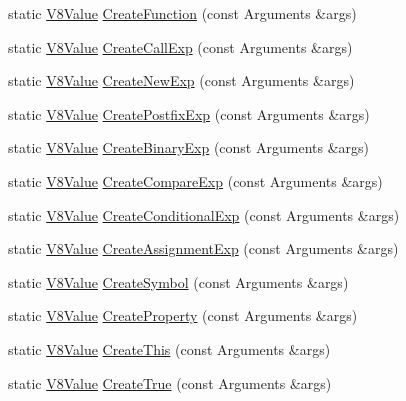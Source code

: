 \begin{DoxyCompactItemize}
static \hyperlink{namespacemocha_a22eca0d76f439fca2a26cae77eb6ade4}{V8Value} \hyperlink{classmocha_1_1_j_s_ast_ae958cde7c31cc2635b2a36ffdc0e3613}{CreateFunction} (const Arguments \&args)
\item 
static \hyperlink{namespacemocha_a22eca0d76f439fca2a26cae77eb6ade4}{V8Value} \hyperlink{classmocha_1_1_j_s_ast_a3b23f21605fc3f8766ad3ddf10e4b7e7}{CreateCallExp} (const Arguments \&args)
\item 
static \hyperlink{namespacemocha_a22eca0d76f439fca2a26cae77eb6ade4}{V8Value} \hyperlink{classmocha_1_1_j_s_ast_a263c0b57b8fe8d86b491c0f6ce002368}{CreateNewExp} (const Arguments \&args)
\item 
static \hyperlink{namespacemocha_a22eca0d76f439fca2a26cae77eb6ade4}{V8Value} \hyperlink{classmocha_1_1_j_s_ast_a7beae8b385014dbff724e289243e6cb7}{CreatePostfixExp} (const Arguments \&args)
\item 
static \hyperlink{namespacemocha_a22eca0d76f439fca2a26cae77eb6ade4}{V8Value} \hyperlink{classmocha_1_1_j_s_ast_a93636eb304578e4fb27a82627a02292b}{CreateBinaryExp} (const Arguments \&args)
\item 
static \hyperlink{namespacemocha_a22eca0d76f439fca2a26cae77eb6ade4}{V8Value} \hyperlink{classmocha_1_1_j_s_ast_a44502b59665456b9459fa45c85f79029}{CreateCompareExp} (const Arguments \&args)
\item 
static \hyperlink{namespacemocha_a22eca0d76f439fca2a26cae77eb6ade4}{V8Value} \hyperlink{classmocha_1_1_j_s_ast_a62a38a16e7be29850b729e73f024eea2}{CreateConditionalExp} (const Arguments \&args)
\item 
static \hyperlink{namespacemocha_a22eca0d76f439fca2a26cae77eb6ade4}{V8Value} \hyperlink{classmocha_1_1_j_s_ast_a0eb393ab91a1c9299243fd5c6b53c3c6}{CreateAssignmentExp} (const Arguments \&args)
\item 
static \hyperlink{namespacemocha_a22eca0d76f439fca2a26cae77eb6ade4}{V8Value} \hyperlink{classmocha_1_1_j_s_ast_a05f91fb94562e344f28eecae65d88d80}{CreateSymbol} (const Arguments \&args)
\item 
static \hyperlink{namespacemocha_a22eca0d76f439fca2a26cae77eb6ade4}{V8Value} \hyperlink{classmocha_1_1_j_s_ast_aa2eae030ff22ae6968d483e46e003860}{CreateProperty} (const Arguments \&args)
\item 
static \hyperlink{namespacemocha_a22eca0d76f439fca2a26cae77eb6ade4}{V8Value} \hyperlink{classmocha_1_1_j_s_ast_ae5138214790e162c52447a2f6bcc75fa}{CreateThis} (const Arguments \&args)
\item 
static \hyperlink{namespacemocha_a22eca0d76f439fca2a26cae77eb6ade4}{V8Value} \hyperlink{classmocha_1_1_j_s_ast_a37625837c9e1c689dfc3b324d76fd77a}{CreateTrue} (const Arguments \&args)

\end{DoxyCompactItemize}
